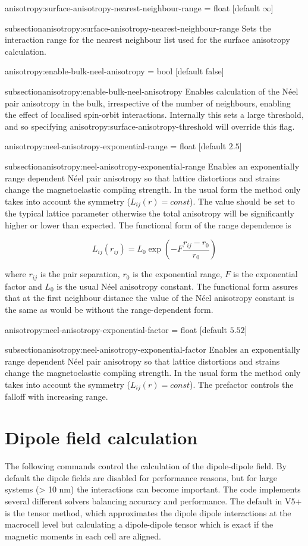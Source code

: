 {\zicf anisotropy:surface-anisotropy-nearest-neighbour-range = float [default $\infty$]}
{subsection}{anisotropy:surface-anisotropy-nearest-neighbour-range} Sets the interaction range for the nearest neighbour list used for the surface anisotropy calculation.

{\zicf anisotropy:enable-bulk-neel-anisotropy = bool [default false]}
{subsection}{anisotropy:enable-bulk-neel-anisotropy} Enables calculation of the N\'eel pair anisotropy in the bulk, irrespective of the number of neighbours, enabling the effect of localised spin-orbit interactions. Internally this sets a large threshold, and so specifying anisotropy:surface-anisotropy-threshold will override this flag.

{\zicf anisotropy:neel-anisotropy-exponential-range = float [default $2.5$]}
{subsection}{anisotropy:neel-anisotropy-exponential-range} Enables an exponentially range dependent N\'eel pair anisotropy so that lattice distortions and strains change the magnetoelastic compling strength. In the usual form the method only takes into account the symmetry ($L_{ij}(r) = const$). The value should be set to the typical lattice parameter otherwise the total anisotropy will be significantly higher or lower than expected. The functional form of the range dependence is

\begin{equation}
   L_{ij}(r_{ij}) = L_0 \exp\left(-F\frac{r_{ij} - r_0}{r_{0}}\right)
\end{equation}

\noindent where $r_{ij}$ is the pair separation, $r_0$ is the exponential range, $F$ is the exponential factor and $L_0$ is the usual N\'eel anisotropy constant. The functional form assures that at the first neighbour distance the value of the N\'eel anisotropy constant is the same as would be without the range-dependent form.

{\zicf anisotropy:neel-anisotropy-exponential-factor = float [default $5.52$]}
{subsection}{anisotropy:neel-anisotropy-exponential-factor} Enables an exponentially range dependent N\'eel pair anisotropy so that lattice distortions and strains change the magnetoelastic compling strength. In the usual form the method only takes into account the symmetry ($L_{ij}(r)
= const$). The prefactor controls the falloff with increasing range.

\section*{Dipole field calculation}
The following commands control the calculation of the dipole-dipole field. By default the dipole fields are disabled for performance reasons, but for large systems (> 10 nm) the interactions can become important. The \vampire code implements several different solvers balancing accuracy and performance. The default in V5+ is the tensor method, which approximates the dipole dipole interactions at the macrocell level but calculating a dipole-dipole tensor which is exact if the magnetic moments in each cell are aligned.

